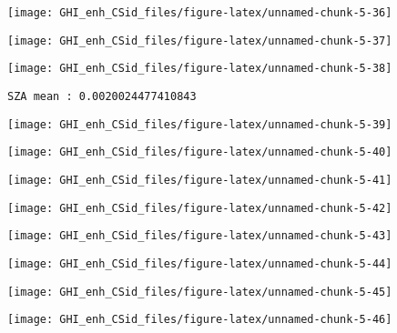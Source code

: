 \documentclass[
  10pt,
  a4paper,oneside]{article}
\begin{document}
\begin{center}\texttt{[image: GHI\_enh\_CSid\_files/figure-latex/unnamed-chunk-5-36]} \end{center}

\begin{center}\texttt{[image: GHI\_enh\_CSid\_files/figure-latex/unnamed-chunk-5-37]} \end{center}

\begin{center}\texttt{[image: GHI\_enh\_CSid\_files/figure-latex/unnamed-chunk-5-38]} \end{center}

\begin{verbatim}
SZA mean : 0.0020024477410843 
\end{verbatim}

\begin{center}\texttt{[image: GHI\_enh\_CSid\_files/figure-latex/unnamed-chunk-5-39]} \end{center}

\begin{center}\texttt{[image: GHI\_enh\_CSid\_files/figure-latex/unnamed-chunk-5-40]} \end{center}

\begin{center}\texttt{[image: GHI\_enh\_CSid\_files/figure-latex/unnamed-chunk-5-41]} \end{center}

\begin{center}\texttt{[image: GHI\_enh\_CSid\_files/figure-latex/unnamed-chunk-5-42]} \end{center}

\begin{center}\texttt{[image: GHI\_enh\_CSid\_files/figure-latex/unnamed-chunk-5-43]} \end{center}

\begin{center}\texttt{[image: GHI\_enh\_CSid\_files/figure-latex/unnamed-chunk-5-44]} \end{center}

\begin{center}\texttt{[image: GHI\_enh\_CSid\_files/figure-latex/unnamed-chunk-5-45]} \end{center}

\begin{center}\texttt{[image: GHI\_enh\_CSid\_files/figure-latex/unnamed-chunk-5-46]} \end{center}
\end{document}
